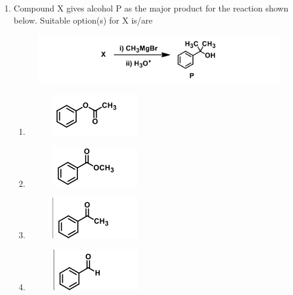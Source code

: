 \documentclass[journal,12pt,onecolumn]{IEEEtran}
\begin{document}
\begin{enumerate}
    \item Compound X gives alcohol P as the major product for the reaction shown below. Suitable option(s) for X is/are\\
    \begin{figure}[H]
		\centering
	    \includegraphics[scale=0.5]{25}
		    \caption*{}
		\label{fig:Q25}
	\end{figure}
    \begin{enumerate}
        \item \begin{figure}[H]
		\centering
            \includegraphics{25a}
		    \caption*{}
		\label{fig:Q25a}
	\end{figure}
        \item \begin{figure}[H]
		\centering
            \includegraphics{25b}
		    \caption*{}
		\label{fig:Q25b}
	\end{figure}
        \item \begin{figure}[H]
		\centering
            \includegraphics{25c}
		    \caption*{}
		\label{fig:Q25c}
	\end{figure}
        \item \begin{figure}[H]
		\centering
            \includegraphics{25d}
		    \caption*{}
		\label{fig:Q25d}
	\end{figure}
    \end{enumerate}


\end{enumerate}
\end{document}
